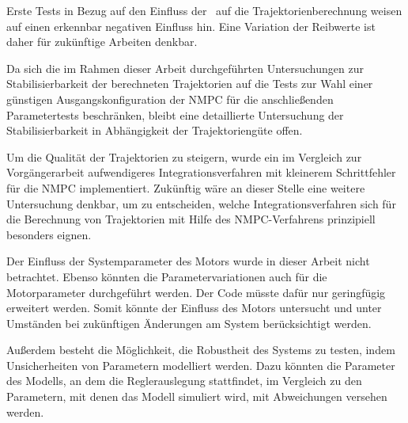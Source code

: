 Erste Tests in Bezug auf den Einfluss der \crb\ auf die Trajektorienberechnung weisen auf einen erkennbar negativen Einfluss hin. Eine Variation der Reibwerte ist daher für zukünftige Arbeiten denkbar.

Da sich die im Rahmen dieser Arbeit durchgeführten Untersuchungen zur Stabilisierbarkeit der berechneten Trajektorien auf die Tests zur Wahl einer günstigen Ausgangskonfiguration der NMPC für die anschließenden Parametertests beschränken, bleibt eine detaillierte Untersuchung der Stabilisierbarkeit in Abhängigkeit der Trajektoriengüte offen.

Um die Qualität der Trajektorien zu steigern, wurde ein im Vergleich zur Vorgängerarbeit aufwendigeres Integrationsverfahren mit kleinerem Schrittfehler für die NMPC implementiert. Zukünftig wäre an dieser Stelle eine weitere Untersuchung denkbar, um zu entscheiden, welche Integrationsverfahren sich für die Berechnung von Trajektorien mit Hilfe des NMPC-Verfahrens prinzipiell besonders eignen. 

Der Einfluss der Systemparameter des Motors wurde in dieser Arbeit nicht betrachtet.
Ebenso könnten die Parametervariationen auch für die Motorparameter durchgeführt werden.
Der Code müsste dafür nur geringfügig erweitert werden.
Somit könnte der Einfluss des Motors untersucht und unter Umständen bei zukünftigen Änderungen am System berücksichtigt werden.

Außerdem besteht die Möglichkeit, die Robustheit des Systems zu testen, indem Unsicherheiten von Parametern modelliert werden.
Dazu könnten die Parameter des Modells, an dem die Reglerauslegung stattfindet, im Vergleich zu den Parametern, mit denen das Modell simuliert wird, mit Abweichungen versehen werden.

